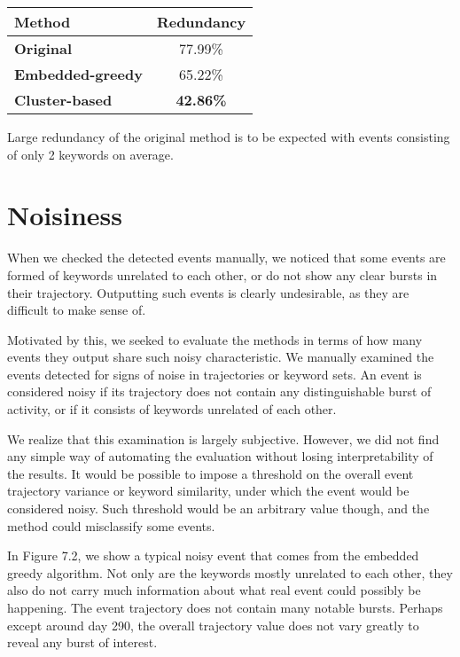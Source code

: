 \hspace{\fill}

\begin{minipage}{\linewidth}
\centering
\begin{tabular}{ l c }\toprule[1.5pt]
\bf Method 	 & \bf Redundancy \\ \midrule
\bf Original &  77.99\% \\
\bf Embedded-greedy   &  65.22\% \\
\bf Cluster-based &  \bf 42.86\% \\ \bottomrule[1.25pt]
\end {tabular}\par
{} \label{tab:title} 
\end{minipage}

\hspace{\fill}

Large redundancy of the original method is to be expected with events consisting of only 2 keywords on average.

\section{Noisiness} \label{sec:noise-evaluation}

When we checked the detected events manually, we noticed that some events are formed of keywords unrelated to each other, or do not show any clear bursts in their trajectory. Outputting such events is clearly undesirable, as they are difficult to make sense of.

Motivated by this, we seeked to evaluate the methods in terms of how many events they output share such noisy characteristic. We manually examined the events detected for signs of noise in trajectories or keyword sets. An event is considered noisy if its trajectory does not contain any distinguishable burst of activity, or if it consists of keywords unrelated of each other.

We realize that this examination is largely subjective. However, we did not find any simple way of automating the evaluation without losing interpretability of the results. It would be possible to impose a threshold on the overall event trajectory variance or keyword similarity, under which the event would be considered noisy. Such threshold would be an arbitrary value though, and the method could misclassify some events.

In Figure 7.2, we show a typical noisy event that comes from the embedded greedy algorithm. Not only are the keywords mostly unrelated to each other, they also do not carry much information about what real event could possibly be happening. The event trajectory does not contain many notable bursts. Perhaps except around day 290, the overall trajectory value does not vary greatly to reveal any burst of interest.

